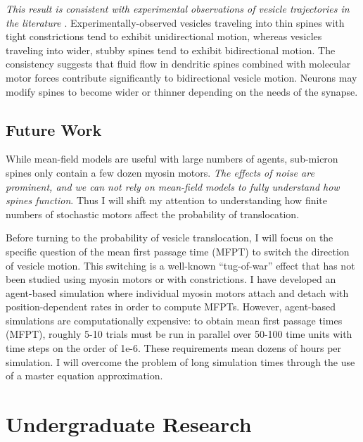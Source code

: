 \documentclass[a4paper,11pt]{article}
\begin{document}
\textit{This result is consistent with experimental observations of vesicle trajectories in the literature \cite{park2020dynamics}}. Experimentally-observed vesicles traveling into thin spines with tight constrictions tend to exhibit unidirectional motion, whereas vesicles traveling into wider, stubby spines tend to exhibit bidirectional motion. The consistency suggests that fluid flow in dendritic spines combined with molecular motor forces contribute significantly to bidirectional vesicle motion. Neurons may modify spines to become wider or thinner depending on the needs of the synapse.

\subsection{Future Work}
While mean-field models are useful with large numbers of agents, sub-micron spines only contain a few dozen myosin motors. \textit{The effects of noise are prominent, and we can not rely on mean-field models to fully understand how spines function}. Thus I will shift my attention to understanding how finite numbers of stochastic motors affect the probability of translocation.

Before turning to the probability of vesicle translocation, I will focus on the specific question of the mean first passage time (MFPT) to switch the direction of vesicle motion. This switching is a well-known ``tug-of-war'' effect \cite{julicher1995cooperative} that has not been studied using myosin motors or with constrictions. I have developed an agent-based simulation where individual myosin motors attach and detach with position-dependent rates in order to compute MFPTs. However, agent-based simulations are computationally expensive: to obtain mean first passage times (MFPT), roughly 5-10 trials must be run in parallel over 50-100 time units with time steps on the order of 1e-6. These requirements mean dozens of hours per simulation. I will overcome the problem of long simulation times through the use of a master equation approximation.


\section{Undergraduate Research}\label{sec:undergrad}

\end{document}

